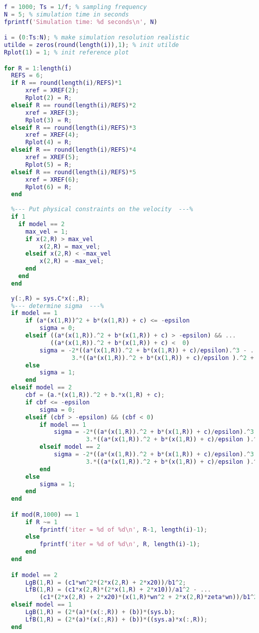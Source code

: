 \begin{lstlisting}[language=matlab]
f = 1000; Ts = 1/f; % sampling frequency
N = 5; % simulation time in seconds
fprintf('Simulation time: %d seconds\n', N)

i = (0:Ts:N); % make simulation resolution realistic
utilde = zeros(round(length(i)),1); % init utilde
Rplot(1) = 1; % init reference plot

for R = 1:length(i)
  REFS = 6;
  if R == round(length(i)/REFS)*1
      xref = XREF(2);
      Rplot(2) = R;
  elseif R == round(length(i)/REFS)*2
      xref = XREF(3);
      Rplot(3) = R;
  elseif R == round(length(i)/REFS)*3
      xref = XREF(4);
      Rplot(4) = R;
  elseif R == round(length(i)/REFS)*4
      xref = XREF(5);
      Rplot(5) = R;
  elseif R == round(length(i)/REFS)*5
      xref = XREF(6);
      Rplot(6) = R;
  end
  
  %--- Put physical constraints on the velocity  ---%
  if 1
    if model == 2
      max_vel = 1;
      if x(2,R) > max_vel
          x(2,R) = max_vel;
      elseif x(2,R) < -max_vel
          x(2,R) = -max_vel;
      end
    end
  end
 
  y(:,R) = sys.C*x(:,R);
  %--- determine sigma  ---% 
  if model == 1
      if (a*(x(1,R))^2 + b*(x(1,R)) + c) <= -epsilon
          sigma = 0;
      elseif ((a*(x(1,R)).^2 + b*(x(1,R)) + c) > -epsilon) && ...
             ((a*(x(1,R)).^2 + b*(x(1,R)) + c) <  0)
          sigma = -2*((a*(x(1,R)).^2 + b*(x(1,R)) + c)/epsilon).^3 - ...
                   3.*((a*(x(1,R)).^2 + b*(x(1,R)) + c)/epsilon ).^2 + 1;
      else
          sigma = 1;
      end
  elseif model == 2
      cbf = (a.*(x(1,R)).^2 + b.*x(1,R) + c);
      if cbf <= -epsilon
          sigma = 0;
      elseif (cbf > -epsilon) && (cbf < 0)
          if model == 1
              sigma = -2*((a*(x(1,R)).^2 + b*(x(1,R)) + c)/epsilon).^3 - ...
                       3.*((a*(x(1,R)).^2 + b*(x(1,R)) + c)/epsilon ).^2 + 1;
          elseif model == 2
              sigma = -2*((a*(x(1,R)).^2 + b*(x(1,R)) + c)/epsilon).^3 - ...
                       3.*((a*(x(1,R)).^2 + b*(x(1,R)) + c)/epsilon ).^2 + 1;
          end
      else
          sigma = 1;
      end 
  end

  if mod(R,1000) == 1 
      if R ~= 1
          fprintf('iter = %d of %d\n', R-1, length(i)-1);
      else
          fprintf('iter = %d of %d\n', R, length(i)-1);
      end
  end

  if model == 2
      LgB(1,R) = (c1*wn^2*(2*x(2,R) + 2*x20))/b1^2;
      LfB(1,R) = (c1*x(2,R)*(2*x(1,R) + 2*x10))/a1^2 - ...
          (c1*(2*x(2,R) + 2*x20)*(x(1,R)*wn^2 + 2*x(2,R)*zeta*wn))/b1^2;  
  elseif model == 1
      LgB(1,R) = (2*(a)*(x(:,R)) + (b))*(sys.b);
      LfB(1,R) = (2*(a)*(x(:,R)) + (b))*((sys.a)*x(:,R));
  end
  

\end{lstlisting}
